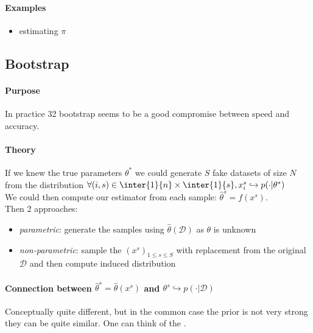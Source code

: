 \paragraph{Examples}
\begin{itemize}
    \item estimating $\pi$
\end{itemize}

\subsection{Bootstrap}
\paragraph{Purpose}
In practice 32 bootstrap seems to be a good compromise between speed and accuracy.\\
\paragraph{Theory}
If we knew the true parameters $\theta^{*}$ we could generate $S$ fake datasets of size
$N$ from the distribution $\forall (i,s)\in\inter{1}{n}\times\inter{1}{s}, x^{s}_{i}
\hookrightarrow p(\cdot|\theta^{*})$\\
We could then compute our estimator from each sample: $\hat{\theta}^{s} = f(x^{s})$.\\
Then 2 approaches:
\begin{itemize}
    \item \emph{parametric}: generate the samples using $\hat{\theta}(\mathcal{D})$ as
        $\theta$ is unknown
    \item \emph{non-parametric}: sample the $\left(x^{s}\right)_{1\leq s\leq S}$ with
        replacement from the original $\mathcal{D}$ and then compute induced 
        distribution
\end{itemize}

\paragraph{Connection between $\hat{\theta}^{s} = \hat{\theta}(x^{s})$ and $\theta^{s}
\hookrightarrow p(\cdot|\mathcal{D})$}
Conceptually quite different, but in the common case the prior is not very strong
they can be quite similar. 
One can think of the .


